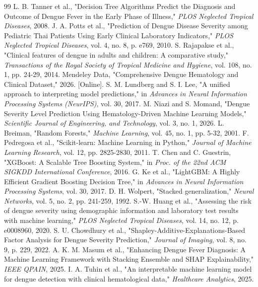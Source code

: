 \documentclass[12pt, a4paper]{report}
\begin{document}
\begin{thebibliography}{99}
 L. B. Tanner et al., "Decision Tree Algorithms Predict the Diagnosis and Outcome of Dengue Fever in the Early Phase of Illness," \textit{PLOS Neglected Tropical Diseases}, 2008.
 J. A. Potts et al., "Prediction of Dengue Disease Severity among Pediatric Thai Patients Using Early Clinical Laboratory Indicators," \textit{PLOS Neglected Tropical Diseases}, vol. 4, no. 8, p. e769, 2010.
 S. Rajapakse et al., "Clinical features of dengue in adults and children: A comparative study," \textit{Transactions of the Royal Society of Tropical Medicine and Hygiene}, vol. 108, no. 1, pp. 24-29, 2014.
 Mendeley Data, "Comprehensive Dengue Hematology and Clinical Dataset," 2026. [Online].
 S. M. Lundberg and S. I. Lee, "A unified approach to interpreting model predictions," in \textit{Advances in Neural Information Processing Systems (NeurIPS)}, vol. 30, 2017.
 M. Niazi and S. Momand, "Dengue Severity Level Prediction Using Hematology-Driven Machine Learning Models," \textit{Scientific Journal of Engineering, and Technology}, vol. 3, no. 1, 2026.
 L. Breiman, "Random Forests," \textit{Machine Learning}, vol. 45, no. 1, pp. 5-32, 2001.
 F. Pedregosa et al., "Scikit-learn: Machine Learning in Python," \textit{Journal of Machine Learning Research}, vol. 12, pp. 2825-2830, 2011.
 T. Chen and C. Guestrin, "XGBoost: A Scalable Tree Boosting System," in \textit{Proc. of the 22nd ACM SIGKDD International Conference}, 2016.
 G. Ke et al., "LightGBM: A Highly Efficient Gradient Boosting Decision Tree," in \textit{Advances in Neural Information Processing Systems}, vol. 30, 2017.
 D. H. Wolpert, "Stacked generalization," \textit{Neural Networks}, vol. 5, no. 2, pp. 241-259, 1992.
 S.-W. Huang et al., "Assessing the risk of dengue severity using demographic information and laboratory test results with machine learning," \textit{PLOS Neglected Tropical Diseases}, vol. 14, no. 12, p. e0008960, 2020.
 S. U. Chowdhury et al., "Shapley-Additive-Explanations-Based Factor Analysis for Dengue Severity Prediction," \textit{Journal of Imaging}, vol. 8, no. 9, p. 229, 2022.
 A. K. M. Masum et al., "Enhancing Dengue Fever Diagnosis: A Machine Learning Framework with Stacking Ensemble and SHAP Explainability," \textit{IEEE QPAIN}, 2025.
 I. A. Tuhin et al., "An interpretable machine learning model for dengue detection with clinical hematological data," \textit{Healthcare Analytics}, 2025.

\end{thebibliography}
\end{document}
